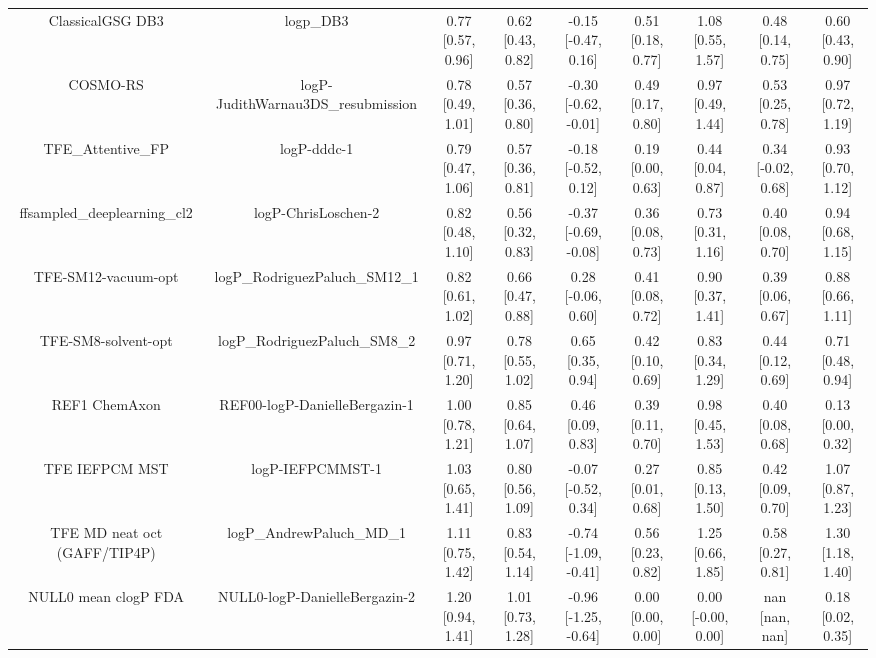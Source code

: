 \documentclass{article}
\begin{document}
\begin{center}
\begin{longtable}{|ccccccccc|}
             ClassicalGSG DB3 &                                      logp\_DB3 &  0.77 [0.57, 0.96] &  0.62 [0.43, 0.82] &   -0.15 [-0.47, 0.16] &  0.51 [0.18, 0.77] &     1.08 [0.55, 1.57] &     0.48 [0.14, 0.75] &     0.60 [0.43, 0.90] \\
                     COSMO-RS &             logP-JudithWarnau3DS\_resubmission &  0.78 [0.49, 1.01] &  0.57 [0.36, 0.80] &  -0.30 [-0.62, -0.01] &  0.49 [0.17, 0.80] &     0.97 [0.49, 1.44] &     0.53 [0.25, 0.78] &     0.97 [0.72, 1.19] \\
             TFE_Attentive_FP &                                    logP-dddc-1 &  0.79 [0.47, 1.06] &  0.57 [0.36, 0.81] &   -0.18 [-0.52, 0.12] &  0.19 [0.00, 0.63] &     0.44 [0.04, 0.87] &    0.34 [-0.02, 0.68] &     0.93 [0.70, 1.12] \\
   ffsampled_deeplearning_cl2 &                            logP-ChrisLoschen-2 &  0.82 [0.48, 1.10] &  0.56 [0.32, 0.83] &  -0.37 [-0.69, -0.08] &  0.36 [0.08, 0.73] &     0.73 [0.31, 1.16] &     0.40 [0.08, 0.70] &     0.94 [0.68, 1.15] \\
          TFE-SM12-vacuum-opt &                 logP\_RodriguezPaluch\_SM12\_1 &  0.82 [0.61, 1.02] &  0.66 [0.47, 0.88] &    0.28 [-0.06, 0.60] &  0.41 [0.08, 0.72] &     0.90 [0.37, 1.41] &     0.39 [0.06, 0.67] &     0.88 [0.66, 1.11] \\
          TFE-SM8-solvent-opt &                  logP\_RodriguezPaluch\_SM8\_2 &  0.97 [0.71, 1.20] &  0.78 [0.55, 1.02] &     0.65 [0.35, 0.94] &  0.42 [0.10, 0.69] &     0.83 [0.34, 1.29] &     0.44 [0.12, 0.69] &     0.71 [0.48, 0.94] \\
                REF1 ChemAxon &                  REF00-logP-DanielleBergazin-1 &  1.00 [0.78, 1.21] &  0.85 [0.64, 1.07] &     0.46 [0.09, 0.83] &  0.39 [0.11, 0.70] &     0.98 [0.45, 1.53] &     0.40 [0.08, 0.68] &     0.13 [0.00, 0.32] \\
               TFE IEFPCM MST &                               logP-IEFPCMMST-1 &  1.03 [0.65, 1.41] &  0.80 [0.56, 1.09] &   -0.07 [-0.52, 0.34] &  0.27 [0.01, 0.68] &     0.85 [0.13, 1.50] &     0.42 [0.09, 0.70] &     1.07 [0.87, 1.23] \\
 TFE MD neat oct (GAFF/TIP4P) &                      logP\_AndrewPaluch\_MD\_1 &  1.11 [0.75, 1.42] &  0.83 [0.54, 1.14] &  -0.74 [-1.09, -0.41] &  0.56 [0.23, 0.82] &     1.25 [0.66, 1.85] &     0.58 [0.27, 0.81] &     1.30 [1.18, 1.40] \\
         NULL0 mean clogP FDA &                  NULL0-logP-DanielleBergazin-2 &  1.20 [0.94, 1.41] &  1.01 [0.73, 1.28] &  -0.96 [-1.25, -0.64] &  0.00 [0.00, 0.00] &    0.00 [-0.00, 0.00] &        nan [nan, nan] &     0.18 [0.02, 0.35] \\

\end{longtable}
\end{center}
\end{document}
